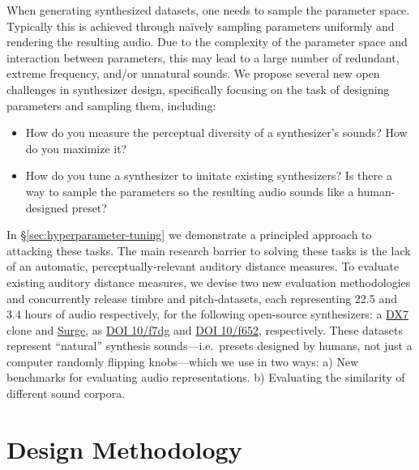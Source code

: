 When generating synthesized datasets, one needs to sample the parameter space. Typically this is achieved through na\"ively sampling parameters uniformly and rendering the resulting audio. Due to the complexity of the parameter space and interaction between parameters, this may lead to a large number of redundant, extreme frequency, and/or unnatural sounds. We propose several new open challenges in synthesizer design, specifically focusing on the task of designing parameters and sampling them, including:
\begin{itemize}
    \item How do you measure the perceptual diversity of a synthesizer's sounds? How do you maximize it?
    \item How do you tune a synthesizer to imitate existing synthesizers? Is there a way to sample the parameters so the resulting audio sounds like a human-designed preset?
\end{itemize}
In \S\ref{sec:hyperparameter-tuning} we demonstrate a principled approach to attacking these tasks. The main research barrier to solving these tasks is the lack of an automatic, perceptually-relevant auditory distance measures.
To evaluate existing auditory distance measures, we devise two new evaluation methodologies and concurrently release timbre and pitch-datasets, each representing 22.5 and 3.4 hours of audio respectively, for the following open-source synthesizers: a \href{https://github.com/bwhitman/learnfm}{DX7} clone and \href{https://surge-synthesizer.github.io/}{Surge}, as \href{https://zenodo.org/record/4677102}{DOI 10/f7dg} and \href{https://zenodo.org/record/4677097}{DOI 10/f652}, respectively. These datasets represent ``natural'' synthesis sounds---i.e.\ presets designed by humans, not just a computer randomly flipping knobs---which we use in two ways: a) New benchmarks for evaluating audio representations. b) Evaluating the similarity of different sound corpora.


\section{Design Methodology}
\label{sec:design-methodology}
